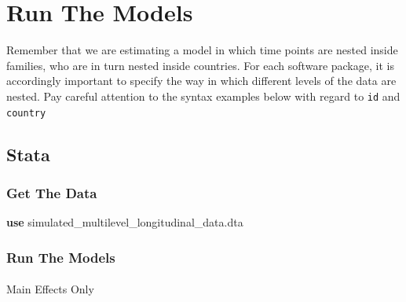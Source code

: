 \documentclass[
  letterpaper,
  DIV=11,
  numbers=noendperiod]{scrreprt}
\makeatletter
\let\oldparagraph\paragraph
\renewcommand{\paragraph}{
    \@ifstar
      \xxxParagraphStar
      \xxxParagraphNoStar
  }
\newcommand{\xxxParagraphStar}[1]{\oldparagraph*{#1}\mbox{}}
\newcommand{\xxxParagraphNoStar}[1]{\oldparagraph{#1}\mbox{}}
\newenvironment{Shaded}{\begin{snugshade}}{\end{snugshade}}
\newcommand{\KeywordTok}[1]{\textcolor[rgb]{0.00,0.23,0.31}{\textbf{#1}}}
\newcommand{\NormalTok}[1]{\textcolor[rgb]{0.00,0.23,0.31}{#1}}
\makeatother
\begin{document}
\section{Run The Models}\label{run-the-models-1}

\begin{tcolorbox}[enhanced jigsaw, colbacktitle=quarto-callout-warning-color!10!white, toprule=.15mm, leftrule=.75mm, opacitybacktitle=0.6, left=2mm, title=\textcolor{quarto-callout-warning-color}{\faExclamationTriangle}\hspace{0.5em}{Warning}, bottomtitle=1mm, breakable, toptitle=1mm, titlerule=0mm, colframe=quarto-callout-warning-color-frame, arc=.35mm, rightrule=.15mm, opacityback=0, bottomrule=.15mm, colback=white, coltitle=black]

Remember that we are estimating a model in which time points are nested
inside families, who are in turn nested inside countries. For each
software package, it is accordingly important to specify the way in
which different levels of the data are nested. Pay careful attention to
the syntax examples below with regard to \texttt{id} and
\texttt{country}

\end{tcolorbox}

\subsection{Stata}

\subsubsection{Get The Data}\label{get-the-data-3}

\begin{Shaded}
\begin{Highlighting}[]

\KeywordTok{use}\NormalTok{ simulated\_multilevel\_longitudinal\_data.dta}
\end{Highlighting}
\end{Shaded}

\subsubsection{Run The Models}\label{run-the-models-2}

\paragraph{Main Effects Only}\label{main-effects-only}
\end{document}

